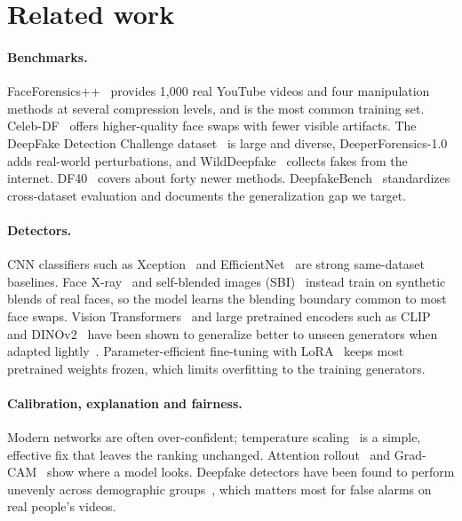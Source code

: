 \section{Related work}

\paragraph{Benchmarks.} FaceForensics++~\citep{rossler2019faceforensics} provides 1{,}000 real
YouTube videos and four manipulation methods at several compression levels, and is the most
common training set. Celeb-DF~\citep{li2020celebdf} offers higher-quality face swaps with fewer
visible artifacts. The DeepFake Detection Challenge dataset~\citep{dolhansky2020dfdc} is large and
diverse, DeeperForensics-1.0~\citep{jiang2020deeperforensics} adds real-world perturbations, and
WildDeepfake~\citep{zi2020wilddeepfake} collects fakes from the internet. DF40~\citep{yan2024df40}
covers about forty newer methods. DeepfakeBench~\citep{yan2023deepfakebench} standardizes
cross-dataset evaluation and documents the generalization gap we target.

\paragraph{Detectors.} CNN classifiers such as Xception~\citep{chollet2017xception} and
EfficientNet~\citep{tan2019efficientnet} are strong same-dataset baselines. Face
X-ray~\citep{li2020facexray} and self-blended images (SBI)~\citep{shiohara2022sbi} instead train
on synthetic blends of real faces, so the model learns the blending boundary common to most face
swaps. Vision Transformers~\citep{dosovitskiy2021vit} and large pretrained encoders such as
CLIP~\citep{radford2021clip} and DINOv2~\citep{oquab2024dinov2} have been shown to generalize
better to unseen generators when adapted lightly~\citep{ojha2023towards}. Parameter-efficient
fine-tuning with LoRA~\citep{hu2022lora} keeps most pretrained weights frozen, which limits
overfitting to the training generators.

\paragraph{Calibration, explanation and fairness.} Modern networks are often over-confident;
temperature scaling~\citep{guo2017calibration} is a simple, effective fix that leaves the ranking
unchanged. Attention rollout~\citep{abnar2020rollout} and Grad-CAM~\citep{selvaraju2017gradcam}
show where a model looks. Deepfake detectors have been found to perform unevenly across
demographic groups~\citep{trinh2021examination,xu2022comprehensive}, which matters most for false
alarms on real people's videos.
